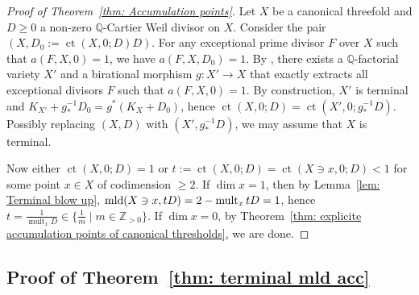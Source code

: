 \documentclass[11pt]{amsart}
\numberwithin{equation}{section}
\newcommand{\Qq}{\mathbb{Q}}
\newcommand{\Zz}{\mathbb{Z}}
\newcommand{\mld}{{\rm{mld}}}
\newcommand{\ct}{\operatorname{ct}}
\newcommand{\mult}{\operatorname{mult}}
\theoremstyle{definition}
\theoremstyle{definition}
\begin{document}

\begin{proof}[Proof of Theorem~\ref{thm: Accumulation points}]
Let $X$ be a canonical threefold and $D\geq 0$ a non-zero $\Qq$-Cartier Weil divisor on $X$. Consider the pair $(X, D_0:=\ct(X,0; D)D)$. For any exceptional prime divisor $F$ over $X$ such that $a(F,X,0)=1$, we have $a(F,X,D_0)=1$. By \cite[Corollary~1.4.3]{BCHM10}, there exists a $\Qq$-factorial variety $X'$ and a birational morphism $g: X'\to X$ that exactly extracts all exceptional divisors $F$ such that $a(F,X,0)=1$. By construction, $X'$ is terminal and $K_{X'}+g_*^{-1}D_0=g^*(K_X+D_0)$, hence $\ct(X,0;D)=\ct(X',0;g_*^{-1}D)$. Possibly replacing $(X,D)$ with $(X',g_*^{-1}D)$, we may assume that $X$ is terminal.

Now either $\ct(X,0; D)=1$ or $t:=\ct(X,0; D)=\ct(X\ni x,0;D)<1$ for some point $x\in X$ of codimension $\geq 2$. If $\dim x=1$, then by Lemma~\ref{lem: Terminal blow up}, $\mld(X\ni x, tD)=2-\mult_x tD=1$, hence $t=\frac{1}{\mult_x D}\in \{\frac{1}{m}\mid m\in \Zz_{>0}\}$. If $\dim x=0$, by Theorem~\ref{thm: explicite accumulation points of canonical thresholds}, we are done.
\end{proof}


\subsection{Proof of Theorem~\ref{thm:  terminal mld acc}}
\end{document}
